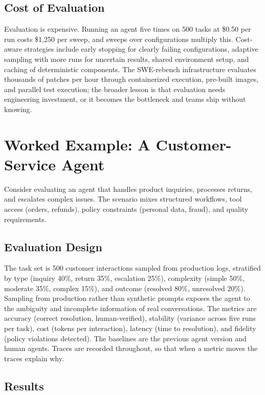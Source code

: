\documentclass[11pt]{book}
\begin{document}
\subsection{Cost of Evaluation}

Evaluation is expensive. Running an agent five times on 500 tasks at \$0.50 per run costs \$1{,}250 per sweep, and sweeps over configurations multiply this. Cost-aware strategies include early stopping for clearly failing configurations, adaptive sampling with more runs for uncertain results, shared environment setup, and caching of deterministic components. The SWE-rebench infrastructure \cite{swebenchinfra2025} evaluates thousands of patches per hour through containerized execution, pre-built images, and parallel test execution; the broader lesson is that evaluation needs engineering investment, or it becomes the bottleneck and teams ship without knowing.

\section{Worked Example: A Customer-Service Agent}

Consider evaluating an agent that handles product inquiries, processes returns, and escalates complex issues. The scenario mixes structured workflows, tool access (orders, refunds), policy constraints (personal data, fraud), and quality requirements.

\subsection{Evaluation Design}

The task set is 500 customer interactions sampled from production logs, stratified by type (inquiry 40\%, return 35\%, escalation 25\%), complexity (simple 50\%, moderate 35\%, complex 15\%), and outcome (resolved 80\%, unresolved 20\%). Sampling from production rather than synthetic prompts exposes the agent to the ambiguity and incomplete information of real conversations. The metrics are accuracy (correct resolution, human-verified), stability (variance across five runs per task), cost (tokens per interaction), latency (time to resolution), and fidelity (policy violations detected). The baselines are the previous agent version and human agents. Traces are recorded throughout, so that when a metric moves the traces explain why.

\subsection{Results}
\end{document}
